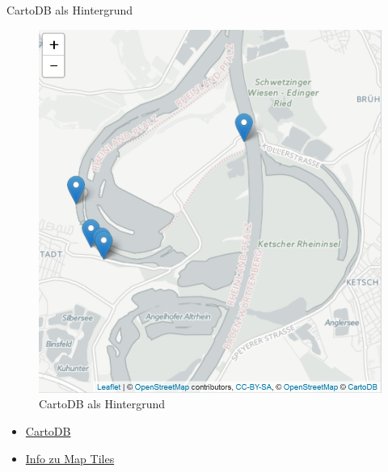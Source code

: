 \documentclass[ignorenonframetext,]{beamer}
\newenvironment{Shaded}{\begin{snugshade}}{\end{snugshade}}
\newcommand{\KeywordTok}[1]{\textcolor[rgb]{0.26,0.66,0.93}{\textbf{#1}}}
\newcommand{\StringTok}[1]{\textcolor[rgb]{0.02,0.61,0.04}{#1}}
\newcommand{\OperatorTok}[1]{\textcolor[rgb]{0.74,0.68,0.62}{#1}}
\newcommand{\NormalTok}[1]{\textcolor[rgb]{0.74,0.68,0.62}{#1}}
\begin{document}
\begin{frame}[fragile]{CartoDB als Hintergrund}

\begin{Shaded}
\end{Shaded}

\begin{figure}
\centering
\includegraphics{figure/CartoDBInteractive.PNG}
\caption{CartoDB als Hintergrund}
\end{figure}

\begin{itemize}
\item
  \href{https://carto.com/attribution}{CartoDB}
\item
  \href{https://www.mapbox.com/help/how-web-maps-work/}{Info zu Map
  Tiles}
\end{itemize}

\end{frame}
\end{document}
